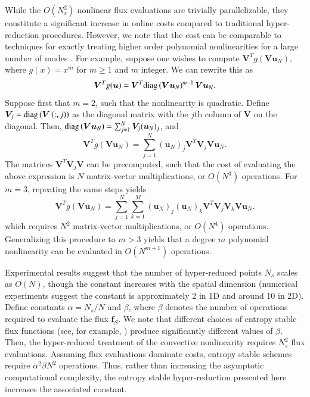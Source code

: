 \documentclass[preprint,10pt]{elsarticle}
\theoremstyle{definition}
\theoremstyle{lemma}
\theoremstyle{theorem}
\theoremstyle{assumption}
\newcommand{\diag}[1]{{\rm diag}\LRp{#1}}
\newcommand{\LRp}[1]{\left( #1 \right)}
\newcommand{\note}[1]{{\color{blue}{#1}}}
\begin{document}
While the $O(N_s^2)$ nonlinear flux evaluations are trivially parallelizable, they constitute a significant increase in online costs compared to traditional hyper-reduction procedures.  However, we note that the cost can be comparable to techniques for exactly treating higher order polynomial nonlinearities for a large number of modes \cite{maboudi2018conservative}.  For example, suppose one wishes to compute $\bm{V}^T g\LRp{\bm{V}\bm{u}_N}$, where $g(x) = x^m$ for $m \geq 1$ and $m$ integer.  We can rewrite this as
\[
\bm{V}^T g(\bm{u}) = \bm{V}^T \diag{\bm{V}\bm{u}_N}^{m-1} \bm{V}\bm{u}_N.
\]
Suppose first that $m = 2$, such that the nonlinearity is quadratic.  Define $\bm{V}_j = \diag{\bm{V}\LRp{:,j}}$ as the diagonal matrix with the $j$th column of $\bm{V}$ on the diagonal.  Then, $\diag{\bm{V}\bm{u}_N} = \sum_{j=1}^N\bm{V}_j (\bm{u}_N)_j$, and 
\[
\bm{V}^T g\LRp{\bm{V}\bm{u}_N} = \sum_{j=1}^N (\bm{u}_N)_j \bm{V}^T \bm{V}_j \bm{V}\bm{u}_N.
\]
The matrices $\bm{V}^T \bm{V}_j \bm{V}$ can be precomputed, such that the cost of evaluating the above expression is $N$ matrix-vector multiplications, or $O(N^3)$ operations.  For $m = 3$, repeating the same steps yields
\[
\bm{V}^T g\LRp{\bm{V}\bm{u}_N} = \sum_{j=1}^N \sum_{k=1}^M (\bm{u}_N)_j  (\bm{u}_N)_k \bm{V}^T \bm{V}_j \bm{V}_k \bm{V}\bm{u}_N.
\]
which requires $N^2$ matrix-vector multiplications, or $O(N^4)$ operations.  Generalizing this procedure to $m > 3$ yields that a degree $m$ polynomial nonlinearity can be evaluated in $O(N^{m+1})$ operations.  

Experimental results suggest that the number of hyper-reduced points $N_s$ scales as $O(N)$, though the constant increases with the spatial dimension (numerical experiments suggest the constant is approximately 2 in 1D and around 10 in 2D).  Define constants $\alpha = N_s/ N$ and $\beta$, where $\beta$ denotes the number of operations required to evaluate the flux $\bm{f}_S$.  We note that different choices of entropy stable flux functions (see, for example, \cite{ismail2009affordable, chandrashekar2013kinetic, hicken2018family}) produce significantly different values of $\beta$.  Then, the hyper-reduced treatment of the convective nonlinearity requires $N_s^2$ flux evaluations.  Assuming flux evaluations dominate costs, entropy stable schemes require $\alpha^2 \beta N^2$ operations.  Thus, rather than increasing the asymptotic computational complexity, the entropy stable hyper-reduction presented here increases the associated constant.  

\end{document}
